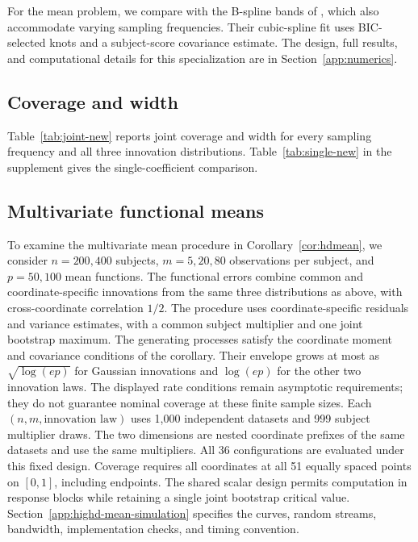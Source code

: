 For the mean problem, we compare with the B-spline bands of \citet{cai_hu_2025}, which also accommodate varying sampling frequencies. Their cubic-spline fit uses BIC-selected knots and a subject-score covariance estimate. The design, full results, and computational details for this specialization are in Section~\ref{app:numerics}.

\subsection{Coverage and width}



Table~\ref{tab:joint-new} reports joint coverage and width for every sampling frequency and all three innovation distributions. Table~\ref{tab:single-new} in the supplement gives the single-coefficient comparison.





\subsection{Multivariate functional means}\label{subsec:highd-mean-simulation}

To examine the multivariate mean procedure in
Corollary~\ref{cor:hdmean}, we consider $n=200,400$ subjects,
$m=5,20,80$ observations per subject, and $p=50,100$ mean functions.
The functional errors combine common
and coordinate-specific innovations from the same three distributions
as above, with cross-coordinate correlation $1/2$.
The procedure uses coordinate-specific residuals and variance estimates,
with a common subject multiplier and one joint bootstrap maximum.
The generating processes satisfy the coordinate moment and covariance
conditions of the corollary. Their envelope grows at most as
$\sqrt{\log(ep)}$ for Gaussian innovations and $\log(ep)$ for the
other two innovation laws. The displayed rate conditions remain
asymptotic requirements; they do not guarantee nominal coverage at
these finite sample sizes.
Each $(n,m,\text{innovation law})$ uses 1,000 independent datasets and
999 subject multiplier draws. The two dimensions are nested coordinate
prefixes of the same datasets and use the same multipliers. All 36
configurations are evaluated under this fixed design.
Coverage requires all coordinates at all 51 equally spaced points on
$[0,1]$, including endpoints. The shared scalar design permits computation
in response blocks while retaining a single joint bootstrap critical value.
Section~\ref{app:highd-mean-simulation} specifies the curves, random streams,
bandwidth, implementation checks, and timing convention.

